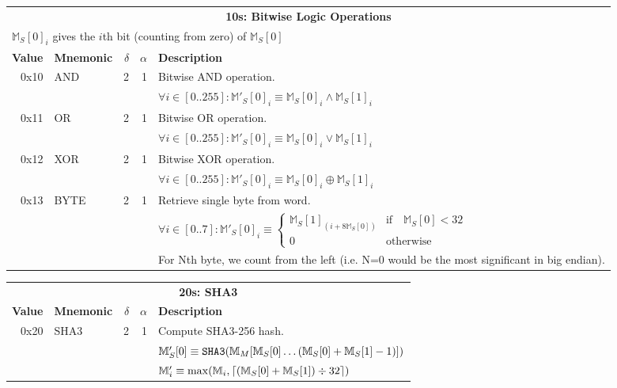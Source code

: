 \documentclass[9pt,oneside]{amsart}
\DeclarePairedDelimiter{\ceil}{\lceil}{\rceil}
\begin{document}
\begin{tabular*}{\columnwidth}[h]{rlrrl}
\toprule
\multicolumn{5}{c}{\textbf{10s: Bitwise Logic Operations}} \\
\multicolumn{5}{l}{$\mathbb{M}_S[0]_i$ gives the $i$th bit (counting from zero) of $\mathbb{M}_S[0]$} \vspace{5pt} \\
\textbf{Value} & \textbf{Mnemonic} & $\delta$ & $\alpha$ & \textbf{Description} \vspace{5pt} \\
0x10 & {\small AND} & 2 & 1 & Bitwise AND operation. \\
&&&& $\forall i \in [0..255]: \mathbb{M}'_S[0]_i \equiv \mathbb{M}_S[0]_i \wedge \mathbb{M}_S[1]_i$ \\
\midrule
0x11 & {\small OR} & 2 & 1 & Bitwise OR operation. \\
&&&& $\forall i \in [0..255]: \mathbb{M}'_S[0]_i \equiv \mathbb{M}_S[0]_i \vee \mathbb{M}_S[1]_i$ \\
\midrule
0x12 & {\small XOR} & 2 & 1 & Bitwise XOR operation. \\
&&&& $\forall i \in [0..255]: \mathbb{M}'_S[0]_i \equiv \mathbb{M}_S[0]_i \oplus \mathbb{M}_S[1]_i$ \\
\midrule
0x13 & {\small BYTE} & 2 & 1 & Retrieve single byte from word. \\
&&&& $\forall i \in [0..7]: \mathbb{M}'_S[0]_i \equiv \begin{cases} \mathbb{M}_S[1]_{(i + 8\mathbb{M}_S[0])} & \text{if} \quad \mathbb{M}_S[0] < 32 \\ 0 & \text{otherwise} \end{cases} $\\
&&&& For Nth byte, we count from the left (i.e. N=0 would be the most significant in big endian). \\
\bottomrule
\end{tabular*}

\begin{tabular*}{\columnwidth}[h]{rlrrl}
\toprule
\multicolumn{5}{c}{\textbf{20s: SHA3}} \vspace{5pt} \\
\textbf{Value} & \textbf{Mnemonic} & $\delta$ & $\alpha$ & \textbf{Description} \vspace{5pt} \\
0x20 & {\small SHA3} & 2 & 1 & Compute SHA3-256 hash. \\
&&&& $\mathbb{M}'_S[0] \equiv \mathtt{\tiny SHA3}(\mathbb{M}_M[ \mathbb{M}_S[0] \dots (\mathbb{M}_S[0] + \mathbb{M}_S[1] - 1) ])$ \\
&&&& $\mathbb{M}'_i \equiv \max(\mathbb{M}_i, \ceil{ (\mathbb{M}_S[0] + \mathbb{M}_S[1]) \div 32 })$ \\
\bottomrule
\end{tabular*}
\end{document}
